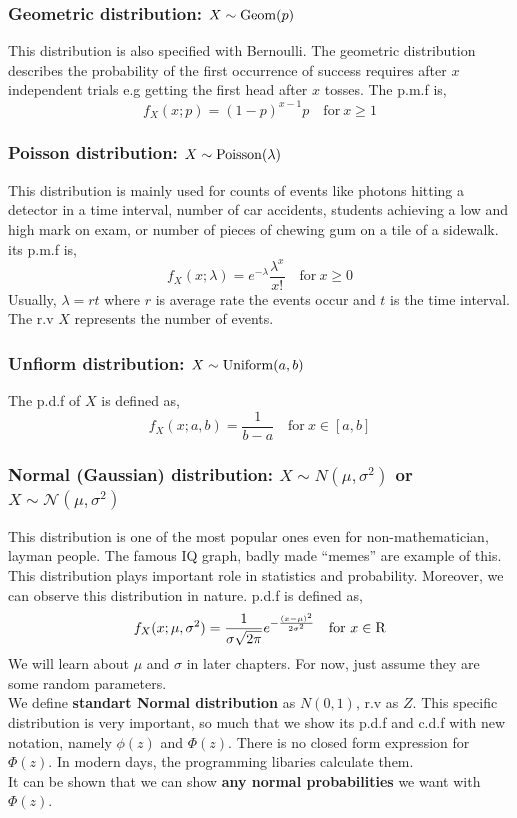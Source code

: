 \subsubsection*{Geometric distribution: $X \sim \operatorname{Geom}(p)$}
This distribution is also specified with Bernoulli. The geometric distribution describes the probability of the first occurrence of success requires after $x$ independent trials e.g getting the first head after $x$ tosses. The p.m.f is,
\[ f_{X}(x; p) = (1-p)^{x-1}p \quad \text{for} \ x \ge 1 \]
\subsubsection*{Poisson distribution: $X \sim \operatorname{Poisson}(\lambda)$}
This distribution is mainly used for counts of events like photons hitting a detector in a time interval, number of car accidents, students achieving a low and high mark on exam, or number of pieces of chewing gum on a tile of a sidewalk. its p.m.f is,
\[f_X(x; \lambda) = e^{-\lambda} \frac{\lambda^{x}}{x!} \quad \text{for} \ x \ge 0 \]
Usually, $\lambda = rt$ where $r$ is average rate the events occur and $t$ is the time interval. The r.v $X$ represents the number of events.
\subsubsection*{Unfiorm distribution: $X \sim \operatorname{Uniform}(a,b)$}
The p.d.f of $X$ is defined as,
\[f_X(x; a,b)= \frac{1}{b-a} \quad \text{for} \ x \in [a,b]\]
\subsubsection*{Normal (Gaussian) distribution: $X \sim N(\mu, \sigma^2)$ or $X \sim \mathcal{N}(\mu, \sigma^2)$}
This distribution is one of the most popular ones even for non-mathematician, layman people. The famous IQ graph, badly made ``memes'' are example of this. This distribution plays important role in statistics and probability. Moreover, we can observe this distribution in nature. p.d.f is defined as,
\[f_X(x; \mu, \sigma^2) = \frac{1}{\sigma \sqrt{2 \pi}}  e^{- \frac{(x- \mu)^2}{2\sigma^2}} \quad \text{for} \ x \in {\operatorname{R}} \]
We will learn about $\mu$ and $\sigma$ in later chapters. For now, just assume they are some random parameters. \\
We define  \textbf{standart Normal distribution} as $N(0,1)$, r.v as $Z$. This specific distribution is very important, so much that we show its p.d.f and c.d.f with new notation, namely $\phi(z)$ and $\Phi(z)$. There is no closed form expression for $\Phi(z)$. In modern days, the programming libaries calculate them. \\
It can be shown that we can show \textbf{any normal  probabilities} we want with $\Phi(z)$.

